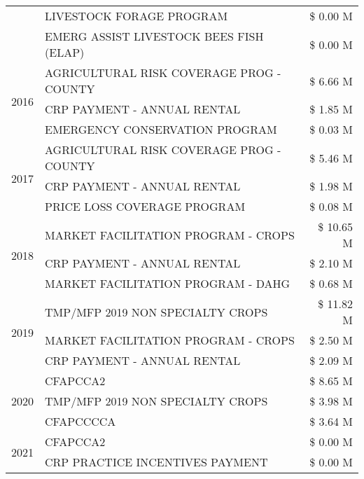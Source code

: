 \begin{tabular}{llr}
 & LIVESTOCK FORAGE PROGRAM & \$ 0.00 M \\
 & EMERG ASSIST LIVESTOCK BEES FISH (ELAP) & \$ 0.00 M \\
\cline{1-3}
\multirow[t]{3}{*}{2016} & AGRICULTURAL RISK COVERAGE PROG - COUNTY      & \$ 6.66 M \\
 & CRP PAYMENT - ANNUAL RENTAL                   & \$ 1.85 M \\
 & EMERGENCY CONSERVATION PROGRAM                & \$ 0.03 M \\
\cline{1-3}
\multirow[t]{3}{*}{2017} & AGRICULTURAL RISK COVERAGE PROG - COUNTY & \$ 5.46 M \\
 & CRP PAYMENT - ANNUAL RENTAL & \$ 1.98 M \\
 & PRICE LOSS COVERAGE PROGRAM & \$ 0.08 M \\
\cline{1-3}
\multirow[t]{3}{*}{2018} & MARKET FACILITATION PROGRAM - CROPS & \$ 10.65 M \\
 & CRP PAYMENT - ANNUAL RENTAL & \$ 2.10 M \\
 & MARKET FACILITATION PROGRAM - DAHG & \$ 0.68 M \\
\cline{1-3}
\multirow[t]{3}{*}{2019} & TMP/MFP 2019 NON SPECIALTY CROPS & \$ 11.82 M \\
 & MARKET FACILITATION PROGRAM - CROPS & \$ 2.50 M \\
 & CRP PAYMENT - ANNUAL RENTAL & \$ 2.09 M \\
\cline{1-3}
\multirow[t]{3}{*}{2020} & CFAPCCA2 & \$ 8.65 M \\
 & TMP/MFP 2019 NON SPECIALTY CROPS & \$ 3.98 M \\
 & CFAPCCCCA & \$ 3.64 M \\
\cline{1-3}
\multirow[t]{2}{*}{2021} & CFAPCCA2 & \$ 0.00 M \\
 & CRP PRACTICE INCENTIVES PAYMENT & \$ 0.00 M \\
\cline{1-3}
\bottomrule
\end{tabular}

